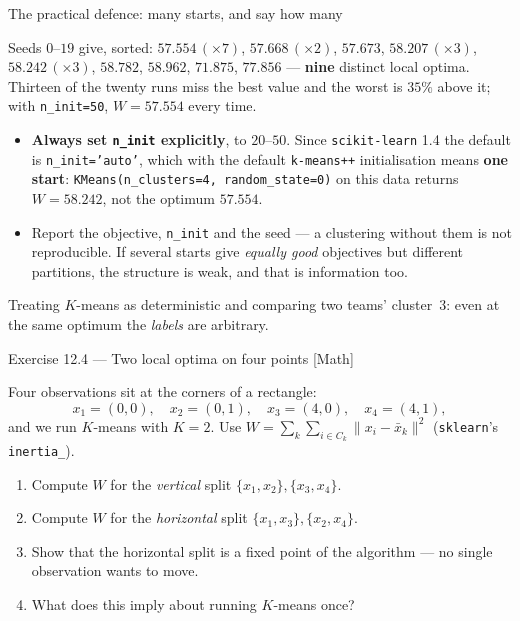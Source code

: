 \documentclass[aspectratio=169,11pt]{beamer}
\begin{document}
\begin{frame}{The practical defence: many starts, and say how many}
  \scriptsize
  \begin{numexample}[{{Twenty single-start runs, $K=4$, \texttt{USArrests} standardised}}]
    Seeds $0$--$19$ give, sorted:
    $57.554\,(\times7)$, $57.668\,(\times2)$, $57.673$, $58.207\,(\times3)$,
    $58.242\,(\times3)$, $58.782$, $58.962$, $71.875$, $77.856$ --- \textbf{nine} distinct
    local optima. Thirteen of the twenty runs miss the best value and the worst is $35\%$
    above it; with \texttt{n\_init=50}, $W=57.554$ every time.
  \end{numexample}
  \begin{readme}[{{What to do}}]
    \begin{itemize}
      \item \textbf{Always set \texttt{n\_init} explicitly}, to $20$--$50$. Since
            \texttt{scikit-learn} 1.4 the default is \texttt{n\_init='auto'}, which with the
            default \texttt{k-means++} initialisation means \textbf{one start}:
            \texttt{KMeans(n\_clusters=4, random\_state=0)} on this data returns $W=58.242$,
            not the optimum $57.554$.
      \item Report the objective, \texttt{n\_init} and the seed --- a clustering without them
            is not reproducible. If several starts give \emph{equally good} objectives but
            different partitions, the structure is weak, and that is information too.
      \end{itemize}
  \end{readme}
  \begin{mistake}
    Treating $K$-means as deterministic and comparing two teams' cluster~$3$: even at the
    same optimum the \emph{labels} are arbitrary.
  \end{mistake}
\end{frame}

\begin{frame}{Exercise 12.4 --- Two local optima on four points [Math]}
\begin{exercise}
  Four observations sit at the corners of a rectangle:
  \[
    x_1=(0,0),\quad x_2=(0,1),\quad x_3=(4,0),\quad x_4=(4,1),
  \]
  and we run $K$-means with $K=2$. Use $W=\sum_k\sum_{i\in C_k}\|x_i-\bar x_k\|^2$
  (\texttt{sklearn}'s \texttt{inertia\_}).
  \begin{enumerate}
    \item Compute $W$ for the \emph{vertical} split $\{x_1,x_2\},\{x_3,x_4\}$.
    \item Compute $W$ for the \emph{horizontal} split $\{x_1,x_3\},\{x_2,x_4\}$.
    \item Show that the horizontal split is a fixed point of the algorithm --- no single
          observation wants to move.
    \item What does this imply about running $K$-means once?
  \end{enumerate}
\end{exercise}
\end{frame}
\end{document}
